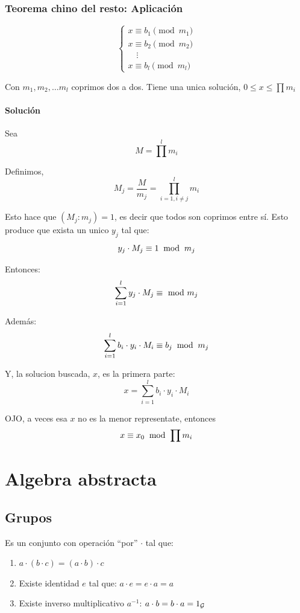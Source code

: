 \documentclass[12pt,a4paper]{report}
\begin{document}
\subsection{Teorema chino del resto: Aplicación}

$$
\begin{cases}
x \equiv b_1 \pmod{m_1} \\
x \equiv b_2 \pmod{m_2} \\
\quad\vdots \\
x \equiv b_l \pmod{m_l}
\end{cases}
$$

Con $m_1, m_2, \dots m_l$ coprimos dos a dos. Tiene una unica solución, $0 \leq x \leq \prod m_i$

\subsubsection{Solución}
Sea $$M = \prod^l m_i$$

Definimos,
$$
M_j = \frac{M}{m_j} = \prod^l_{i = 1, i \neq j} m_i
$$

Esto hace que $(M_j : m_j) = 1$, es decir que todos son coprimos entre sí. Esto produce que exista un unico $y_j$ tal que:
$$
y_j \cdot M_j \equiv 1 \; \bmod \; {{m_j}}
$$

Entonces:
$$
\sum_{i=1}^l y_j \cdot M_j \equiv \; \bmod \; {{m_j}}
$$

Además:
$$
\sum_{i=1}^l b_i \cdot y_i \cdot M_i \equiv b_j \; \bmod \; {{m_j}}
$$

Y, la solucion buscada, $x$, es la primera parte:
$$
x = \sum_{i=1}^l b_i \cdot y_i \cdot M_i
$$

OJO, a veces esa $x$ no es la menor representate, entonces
$$
x \equiv x_0 \; \bmod \; {{\prod m_i}}
$$

\chapter{Algebra abstracta}
\section{Grupos}
Es un conjunto  con operación ``por'' $\cdot$ tal que:
\begin{enumerate}
  \item{$a \cdot (b \cdot c) = (a \cdot b) \cdot c$}
  \item{Existe identidad $e$ tal que: $a \cdot e = e \cdot a = a$}
  \item{Existe inverso multiplicativo $a^{-1}$: $a \cdot b = b \cdot a = 1_{\mathcal{{G}}}$}
\end{enumerate}
\end{document}
